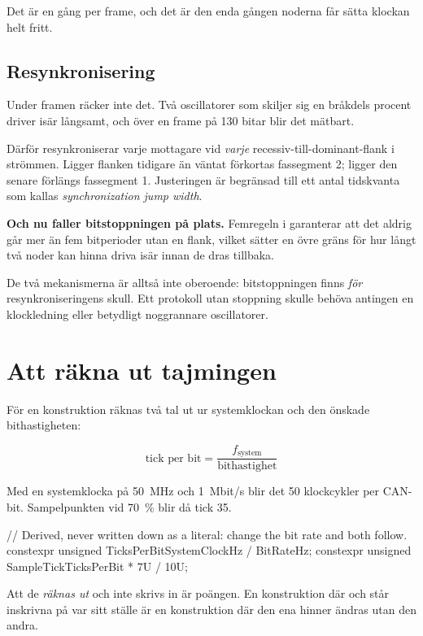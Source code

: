 Det är en gång per frame, och det är den enda gången noderna får sätta klockan helt fritt.

\subsection{Resynkronisering}

Under framen räcker inte det. Två oscillatorer som skiljer sig en bråkdels procent driver isär
långsamt, och över en frame på 130 bitar blir det mätbart.

Därför resynkroniserar varje mottagare vid \emph{varje} recessiv-till-dominant-flank i strömmen.
Ligger flanken tidigare än väntat förkortas fassegment 2; ligger den senare förlängs fassegment 1.
Justeringen är begränsad till ett antal tidskvanta som kallas \emph{synchronization jump width}.

\textbf{Och nu faller bitstoppningen på plats.} Femregeln i  garanterar att
det aldrig går mer än fem bitperioder utan en flank, vilket sätter en övre gräns för hur långt
två noder kan hinna driva isär innan de dras tillbaka.

\begin{aside}
De två mekanismerna är alltså inte oberoende: bitstoppningen finns \emph{för} resynkroniseringens
skull. Ett protokoll utan stoppning skulle behöva antingen en klockledning eller betydligt
noggrannare oscillatorer.
\end{aside}

\section{Att räkna ut tajmingen}

För en konstruktion räknas två tal ut ur systemklockan och den önskade bithastigheten:

\[ \text{tick per bit} = \frac{f_{\text{system}}}{\text{bithastighet}} \]

Med en systemklocka på 50~MHz och 1~Mbit/s blir det 50 klockcykler per CAN-bit. Sampelpunkten vid
70~\% blir då tick 35.

\begin{cppcode}
// Derived, never written down as a literal: change the bit rate and both follow.
constexpr unsigned TicksPerBit{SystemClockHz / BitRateHz};
constexpr unsigned SampleTick{TicksPerBit * 7U / 10U};
\end{cppcode}

Att de \emph{räknas ut} och inte skrivs in är poängen. En konstruktion där  och
 står inskrivna på var sitt ställe är en konstruktion där den ena hinner ändras utan
den andra.

